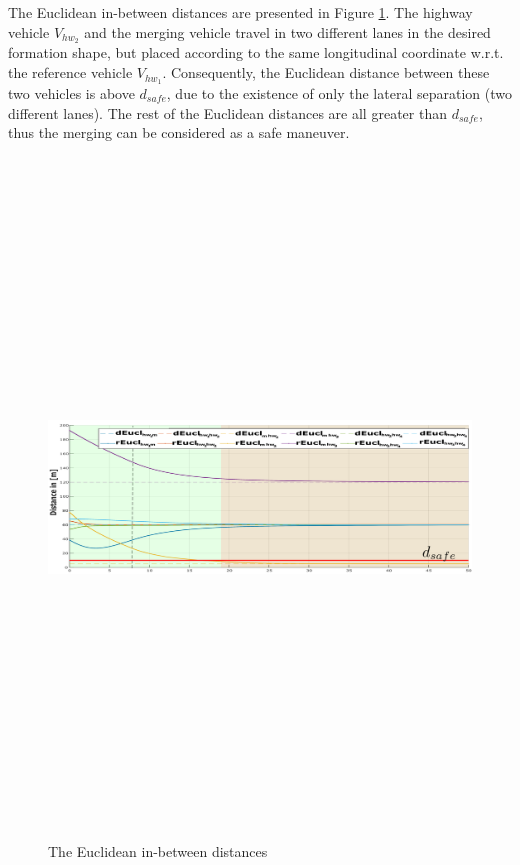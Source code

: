 The Euclidean in-between distances are presented in Figure \ref{fig:scenario02:formation_distances}. The highway vehicle $V_{hw_2}$ and the merging vehicle travel in two different lanes in the desired formation shape, but placed according to the same longitudinal coordinate w.r.t. the reference vehicle $V_{hw_1}$. Consequently, the Euclidean distance between these two vehicles is above $d_{safe}$, due to the existence of only the lateral separation (two different lanes). The rest of the Euclidean distances are all greater than $d_{safe}$, thus the merging can be considered as a safe maneuver. 


     \begin{figure}[!h]
        \centering 
        \includegraphics[width=13cm,height=18cm,keepaspectratio]{chapters/Chapitre_6/Figures/Scenario_2/Scenario2_distances.pdf}
        \caption{The Euclidean in-between distances}
        \label{fig:scenario02:formation_distances}
        \end{figure}

